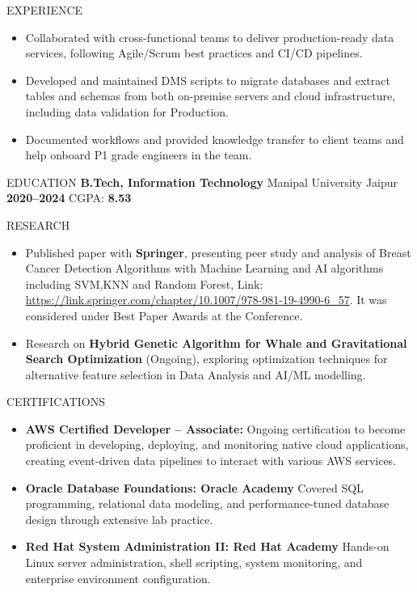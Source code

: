 \documentclass[10pt]{resume}
\begin{document}
\begin{rSection}{EXPERIENCE}
\begin{itemize}
  \item Collaborated with cross-functional teams to deliver production-ready data services, following Agile/Scrum best practices and CI/CD pipelines.
  \item Developed and maintained DMS scripts to migrate databases and extract tables and schemas from both on-premise servers and cloud infrastructure, including data validation for Production.
  \item Documented workflows and provided knowledge transfer to client teams and help onboard P1 grade engineers in the team.
\end{itemize}
\end{rSection}

\begin{rSection}{EDUCATION}
\textbf{B.Tech, Information Technology} \hfill Manipal University Jaipur \\
\textbf{2020--2024} \quad CGPA: \textbf{8.53}
\end{rSection}

\begin{rSection}{RESEARCH}
\begin{itemize}
  \item Published paper with \textbf{Springer}, presenting peer study and analysis of Breast Cancer Detection Algorithms with Machine Learning and AI algorithms including SVM,KNN and Random Forest, Link: \href{https://link.springer.com/chapter/10.1007/978-981-19-4990-6_57}{https://link.springer.com/chapter/10.1007/978-981-19-4990-6\_57}. It was considered under Best Paper Awards at the Conference.
  \item  Research on \textbf{Hybrid Genetic Algorithm for Whale and Gravitational Search Optimization} (Ongoing), exploring optimization techniques for alternative feature selection in Data Analysis and AI/ML modelling.
\end{itemize}
\end{rSection}

\begin{rSection}{CERTIFICATIONS}
\begin{itemize}
  \item \textbf{AWS Certified Developer – Associate:} Ongoing certification to become proficient in developing, deploying, and monitoring native cloud applications, creating event-driven data pipelines to interact with various AWS services.
  \item \textbf{Oracle Database Foundations: Oracle Academy} Covered SQL programming, relational data modeling, and performance-tuned database design through extensive lab practice.
  \item \textbf{Red Hat System Administration II: Red Hat Academy} Hands-on Linux server administration, shell scripting, system monitoring, and enterprise environment configuration.
\end{itemize}
\end{rSection}
\end{document}
